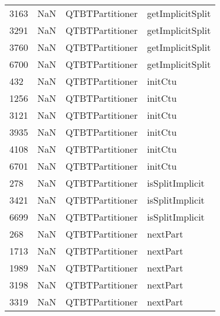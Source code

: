 \begin{tabular}{llll}
3163 &                   NaN &            QTBTPartitioner &                          getImplicitSplit \\
3291 &                   NaN &            QTBTPartitioner &                          getImplicitSplit \\
3760 &                   NaN &            QTBTPartitioner &                          getImplicitSplit \\
6700 &                   NaN &            QTBTPartitioner &                          getImplicitSplit \\
432  &                   NaN &            QTBTPartitioner &                                   initCtu \\
1256 &                   NaN &            QTBTPartitioner &                                   initCtu \\
3121 &                   NaN &            QTBTPartitioner &                                   initCtu \\
3935 &                   NaN &            QTBTPartitioner &                                   initCtu \\
4108 &                   NaN &            QTBTPartitioner &                                   initCtu \\
6701 &                   NaN &            QTBTPartitioner &                                   initCtu \\
278  &                   NaN &            QTBTPartitioner &                           isSplitImplicit \\
3421 &                   NaN &            QTBTPartitioner &                           isSplitImplicit \\
6699 &                   NaN &            QTBTPartitioner &                           isSplitImplicit \\
268  &                   NaN &            QTBTPartitioner &                                  nextPart \\
1713 &                   NaN &            QTBTPartitioner &                                  nextPart \\
1989 &                   NaN &            QTBTPartitioner &                                  nextPart \\
3198 &                   NaN &            QTBTPartitioner &                                  nextPart \\
3319 &                   NaN &            QTBTPartitioner &                                  nextPart \\

\end{tabular}
